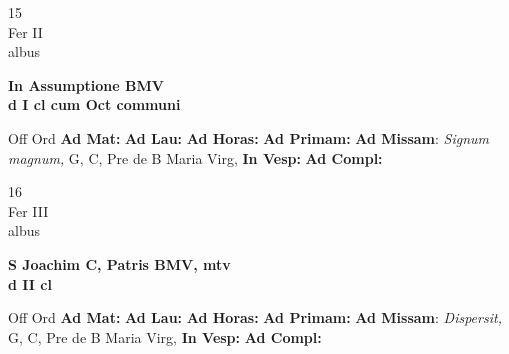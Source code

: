 \documentclass[10pt, openany]{book}
\begin{document}
    \begin{center}
        \begin{minipage}{3.5in}
            \vspace{2em}
            \begin{minipage}{0.5in}
                {\Huge 15} \\
                {\normalsize Fer II} \\
                {\normalsize albus}
            \end{minipage}
            \begin{minipage}{3.0in}
                \textbf{ \large In Assumptione BMV \\
                \textnormal{\normalsize d I cl cum Oct communi}} \\ 
            \end{minipage}
            \begin{justify}Off Ord
                \textbf{Ad Mat: }
                \textbf{Ad Lau: }
                \textbf{Ad Horas: }
                \textbf{Ad Primam: }\textbf{Ad Missam}: \textit{Signum magnum,} G, C, Pre de B Maria Virg,  
                \textbf{In Vesp: }
                \textbf{Ad Compl: }
            \end{justify}
        \end{minipage}
    \end{center}

    \begin{center}
        \begin{minipage}{3.5in}
            \vspace{2em}
            \begin{minipage}{0.5in}
                {\Huge 16} \\
                {\normalsize Fer III} \\
                {\normalsize albus}
            \end{minipage}
            \begin{minipage}{3.0in}
                \textbf{ \large S Joachim C, Patris BMV, mtv \\
                \textnormal{\normalsize d II cl}} \\ 
            \end{minipage}
            \begin{justify}Off Ord
                \textbf{Ad Mat: }
                \textbf{Ad Lau: }
                \textbf{Ad Horas: }
                \textbf{Ad Primam: }\textbf{Ad Missam}: \textit{Dispersit,} G, C, Pre de B Maria Virg,  
                \textbf{In Vesp: }
                \textbf{Ad Compl: }
            \end{justify}
        \end{minipage}
    \end{center}
\end{document}
